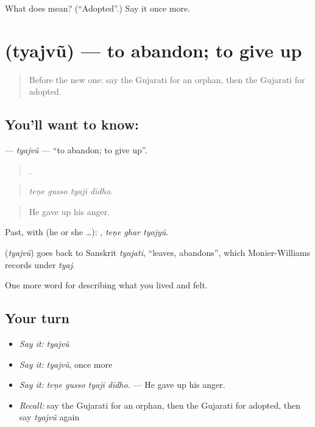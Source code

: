 \begin{tcolorbox}[breakable,colback=teal!4,colframe=teal!35!black,title={Before you move on}]
What does  mean? (\textquotedblleft{}Adopted\textquotedblright{}.) Say it once more.
\end{tcolorbox}
\section[\texorpdfstring{\gu{ત્યજવું} (tyajvũ)}{ત્યજવું (tyajvũ)}]{ (tyajvũ) — to abandon; to give up}

\label{lesson:GU-C500-tyajvu}



\begin{quote}
Before the new one: say the Gujarati for an orphan, then the Gujarati for adopted.
\end{quote}

\subsection*{You'll want to know: }
\textbf{} — \emph{tyajvũ} — \textquotedblleft{}to abandon; to give up\textquotedblright{}.

\begin{quote}
   .
\end{quote}

\begin{quote}
\emph{teṇe gusso tyajī dīdho.}
\end{quote}

\begin{quote}
He gave up his anger.
\end{quote}

Past, with  (he or she …):   , \emph{teṇe ghar tyajyũ}.

\begin{cousinweb}
\textbf{} (\emph{tyajvũ}) goes back to Sanskrit \emph{tyajati}, \textquotedblleft{}leaves, abandons\textquotedblright{}, which Monier-Williams records under \emph{tyaj}.
\end{cousinweb}

\begin{grammarlens}[title={What you've built}]
One more word for describing what you lived and felt.
\end{grammarlens}

\subsection*{Your turn}
\begin{itemize}
\raggedright
  \item \emph{Say it:} \emph{tyajvũ}
  \item \emph{Say it:} \emph{tyajvũ}, once more
  \item \emph{Say it:} \emph{teṇe gusso tyajī dīdho.} — He gave up his anger.
  \item \emph{Recall:} say the Gujarati for an orphan, then the Gujarati for adopted, then say \emph{tyajvũ} again
\end{itemize}

